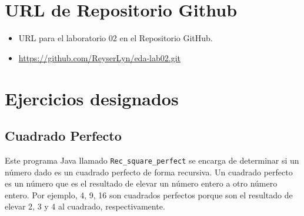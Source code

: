 \documentclass{article}
\begin{document}
\section{URL de Repositorio Github}
	\begin{itemize}
		\item URL para el laboratorio 02 en el Repositorio GitHub.
		\item \url{https://github.com/ReyserLyn/eda-lab02.git}
	\end{itemize}
	
\section{Ejercicios designados}

	\subsection{Cuadrado Perfecto}
 Este programa Java llamado \texttt{Rec\_square\_perfect} se encarga de determinar si un número dado es un cuadrado perfecto de forma recursiva. Un cuadrado perfecto es un número que es el resultado de elevar un número entero a otro número entero. Por ejemplo, 4, 9, 16 son cuadrados perfectos porque son el resultado de elevar 2, 3 y 4 al cuadrado, respectivamente.



\end{document}
